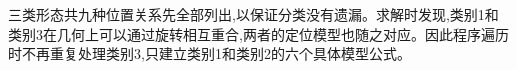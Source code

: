 三类形态共九种位置关系先全部列出,以保证分类没有遗漏。求解时发现,类别1和类别3在几何上可以通过旋转相互重合,两者的定位模型也随之对应。因此程序遍历时不再重复处理类别3,只建立类别1和类别2的六个具体模型公式。
